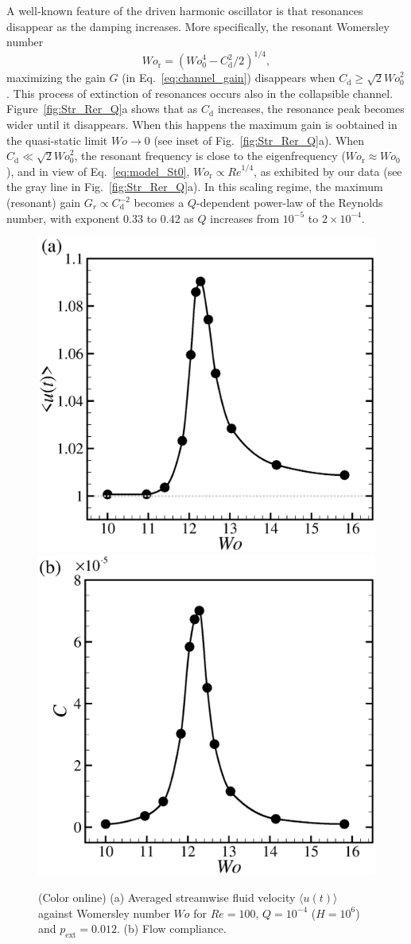\documentclass[aps,prl,reprint,superscriptaddress,floatfix]{revtex4-1}
\newcommand{\Rey}{\mathit{Re}}
\newcommand{\Wo}{\mathit{Wo}}
\begin{document}
A well-known feature of the driven harmonic oscillator is that resonances disappear as the damping increases. More specifically, the resonant Womersley number
\begin{equation}
\Wo_\text{r}=(\Wo^4_0-C_\mathrm{d}^2/2)^{1/4},
\label{eq:St_resonance}
\end{equation}
maximizing the gain $G$ (in Eq.~\ref{eq:channel_gain}) disappears when $C_\text{d} \geqslant \sqrt{2}\Wo^2_0$. This process of extinction of resonances occurs also in the collapsible channel. Figure~\ref{fig:Str_Rer_Q}a shows that as $C_\text{d}$ increases, the resonance peak becomes wider until it disappears. When this happens the maximum gain is oobtained in the quasi-static limit $\Wo\rightarrow 0$ (see inset of Fig.~\ref{fig:Str_Rer_Q}a). When $C_\text{d} \ll \sqrt{2}\Wo^2_0$, the resonant frequency is close to the eigenfrequency ($\Wo_\text{r}\approx\Wo_0$), and in view of Eq.~\ref{eq:model_St0}, $\Wo_\text{r}\propto \Rey^{1/4}$, as exhibited by our data (see the gray line in Fig.~\ref{fig:Str_Rer_Q}a). In this scaling regime, the maximum (resonant) gain $G_r \propto C_\text{d}^{-2}$  becomes a $Q$-dependent power-law of the Reynolds number, with exponent $0.33$ to $0.42$ as $Q$ increases from $10^{-5}$ to $2\times10^{-4}$. 

\begin{figure}
\centering
\includegraphics[width=0.49\linewidth, trim={0.2cm 0.4cm 0.4cm 0.5cm}, clip]{./epsFig/fig6a.eps}
\includegraphics[width=0.49\linewidth, trim={0.2cm 0.4cm 0.4cm 0.5cm}, clip]{./epsFig/fig6b.eps}
\caption{(Color online) (a) Averaged streamwise fluid velocity $\langle u(t) \rangle$ against Womersley number $\Wo$ for $\Rey=100$, $Q=10^{-4}$ ($H=10^6$) and  $p_\mathrm{ext}=0.012$. (b) Flow compliance.}	\label{fig:flowrate_compliance}
\end{figure}
\end{document}
